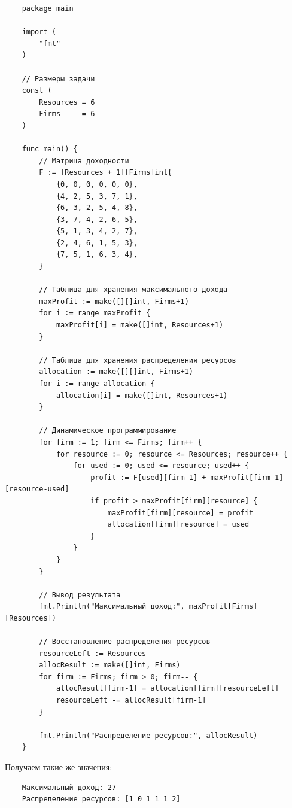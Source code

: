 \documentclass{article}
\begin{document}
\begin{verbatim}
    package main

    import (
        "fmt"
    )
    
    // Размеры задачи
    const (
        Resources = 6
        Firms     = 6
    )
    
    func main() {
        // Матрица доходности
        F := [Resources + 1][Firms]int{
            {0, 0, 0, 0, 0, 0},
            {4, 2, 5, 3, 7, 1},
            {6, 3, 2, 5, 4, 8},
            {3, 7, 4, 2, 6, 5},
            {5, 1, 3, 4, 2, 7},
            {2, 4, 6, 1, 5, 3},
            {7, 5, 1, 6, 3, 4},
        }
    
        // Таблица для хранения максимального дохода
        maxProfit := make([][]int, Firms+1)
        for i := range maxProfit {
            maxProfit[i] = make([]int, Resources+1)
        }
    
        // Таблица для хранения распределения ресурсов
        allocation := make([][]int, Firms+1)
        for i := range allocation {
            allocation[i] = make([]int, Resources+1)
        }
    
        // Динамическое программирование
        for firm := 1; firm <= Firms; firm++ {
            for resource := 0; resource <= Resources; resource++ {
                for used := 0; used <= resource; used++ {
                    profit := F[used][firm-1] + maxProfit[firm-1][resource-used]
                    if profit > maxProfit[firm][resource] {
                        maxProfit[firm][resource] = profit
                        allocation[firm][resource] = used
                    }
                }
            }
        }
    
        // Вывод результата
        fmt.Println("Максимальный доход:", maxProfit[Firms][Resources])
    
        // Восстановление распределения ресурсов
        resourceLeft := Resources
        allocResult := make([]int, Firms)
        for firm := Firms; firm > 0; firm-- {
            allocResult[firm-1] = allocation[firm][resourceLeft]
            resourceLeft -= allocResult[firm-1]
        }
    
        fmt.Println("Распределение ресурсов:", allocResult)
    }
\end{verbatim}

Получаем такие же значения:
\begin{verbatim}
    Максимальный доход: 27
    Распределение ресурсов: [1 0 1 1 1 2]
\end{verbatim}
\end{document}
